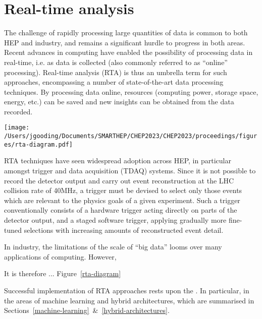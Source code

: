 \section{Real-time analysis}
\label{rta}
The challenge of rapidly processing large quantities of data is common to both HEP and industry, and remains a significant hurdle to progress in both areas. \cite{hu-big-data} Recent advances in computing have enabled the possibility of processing data in real-time, i.e. as data is collected (also commonly referred to as ``online'' processing). \cite{real-time-computing} Real-time analysis (RTA) is thus an umbrella term for such approaches, encompassing a number of state-of-the-art data processing techniques. By processing data online, resources (computing power, storage space, energy, etc.) can be saved and new insights can be obtained from the data recorded.\par


\begin{figure*}[h!]
    \centering
    \texttt{[image: /Users/jgooding/Documents/SMARTHEP/CHEP2023/CHEP2023/proceedings/figures/rta-diagram.pdf]}
    \caption{Diagram demonstrating the real-time analysis approach to data processing. Traditional approaches rely on recording all data and processing this offilne. Real-time analysis reverses this, processing data as it is produced and recording only the relevant processed information, enabling larger volumes of processed data to be stored.}
    \label{rta-diagram}       %
\end{figure*}
RTA techniques have seen widespread adoption across HEP, in particular amongst trigger and data acquisition (TDAQ) systems. Since it is not possible to record the detector output and carry out event reconstruction at the LHC collision rate of {40}{MHz}, a trigger must be devised to select only those events which are relevant to the physics goals of a given experiment. Such a trigger conventionally consists of a hardware trigger acting directly on parts of the detector output, and a staged software trigger, applying gradually more fine-tuned selections with increasing amounts of reconstructed event detail.\par
In industry, the limitations of the scale of ``big data'' looms over many applications of computing. However, \par
It is therefore ... Figure~\ref{rta-diagram}\par
Successful implementation of RTA approaches rests upon the . In particular, in the areas of machine learning and hybrid architectures, which are summarised in Sections~\ref{machine-learning}~\&~\ref{hybrid-architectures}.

